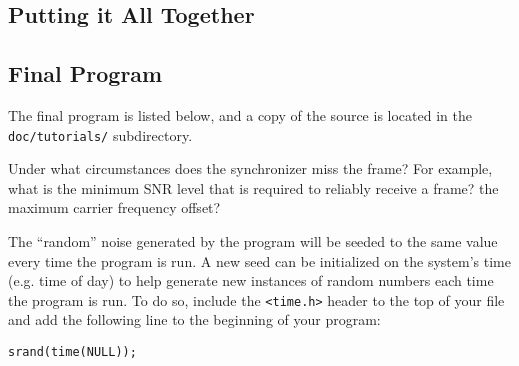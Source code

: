 \subsection{Putting it All Together}
\label{tutorial:framing:xxx}



%
%
\subsection{Final Program}
\label{tutorial:framing:completed}

The final program is listed below,
and a copy of the source is located in the {\tt doc/tutorials/}
subdirectory.
%

%


Under what circumstances does the synchronizer miss the frame?
For example, what is the minimum SNR level that is required to reliably
receive a frame?
the maximum carrier frequency offset?

The ``random'' noise generated by the program will be seeded to the same
value every time the program is run.
A new seed can be initialized on the system's time (e.g. time of day) to
help generate new instances of random numbers each time the program is
run.
To do so, include the {\tt <time.h>} header to the top of your file and
add the following line to the beginning of your program:
%
\begin{Verbatim}[fontsize=\small]
    srand(time(NULL));
\end{Verbatim}
%

